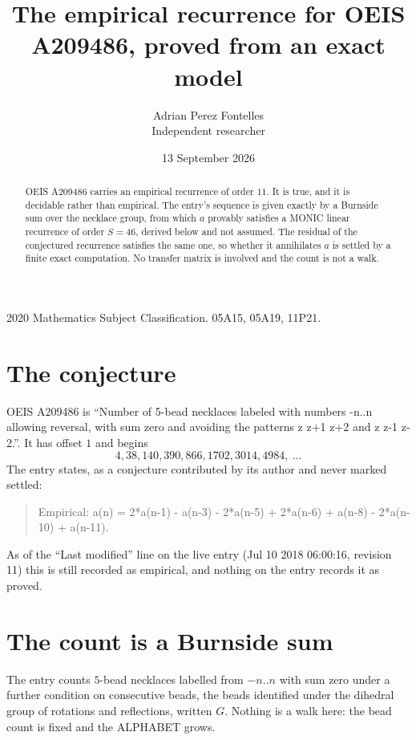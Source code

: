 \documentclass[11pt,a4paper]{article}
\title{The empirical recurrence for OEIS A209486, proved from an exact model}
\author{Adrian Perez Fontelles\\ \small Independent researcher}
\date{13 September 2026}
\theoremstyle{plain}
\theoremstyle{definition}
\begin{document}
\maketitle

\begin{abstract}
OEIS A209486 carries an empirical recurrence of order $11$. It is true, and it is
decidable rather than empirical. The entry's sequence is given exactly by a Burnside sum over the necklace group, from
which $a$ provably satisfies a MONIC linear recurrence of order $S=46$, derived below and not
assumed. The residual of the conjectured recurrence satisfies the same one, so whether it
annihilates $a$ is settled by a finite exact computation. No transfer matrix is involved and
the count is not a walk.
\end{abstract}

\noindent\small 2020 Mathematics Subject Classification. 05A15, 05A19, 11P21.\normalsize

\section{The conjecture}

OEIS A209486 is ``Number of 5-bead necklaces labeled with numbers -n..n allowing reversal, with sum zero and avoiding the patterns z z+1 z+2 and z z-1 z-2.''. It has offset $1$ and begins
\[
4, 38, 140, 390, 866, 1702, 3014, 4984,\ \dots
\]
The entry states, as a conjecture contributed by its author and never marked settled:
\begin{quote}
Empirical: a(n) = 2*a(n-1) - a(n-3) - 2*a(n-5) + 2*a(n-6) + a(n-8) - 2*a(n-10) + a(n-11).
\end{quote}
As of the ``Last modified'' line on the live entry (Jul 10 2018 06:00:16, revision 11)
this is still recorded as empirical, and nothing on the entry records it as proved.

\section{The count is a Burnside sum}

The entry counts $5$-bead necklaces labelled from $-n..n$ with sum zero under a further
condition on consecutive beads, the beads identified under the dihedral group of rotations and reflections, written $G$. Nothing is a
walk here: the bead count is fixed and the ALPHABET grows.
\end{document}
